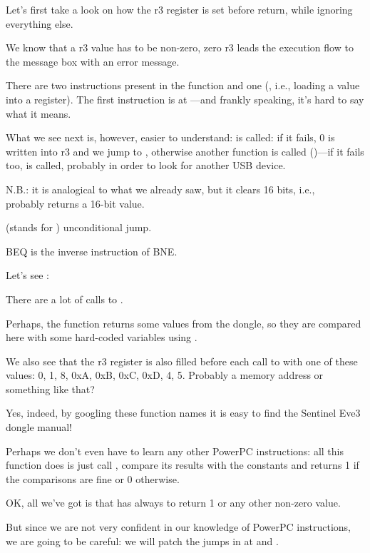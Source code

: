Let's first take a look on how the r3 register is set before return, while ignoring everything else.

We know that a  r3 value has to be non-zero, zero r3 leads the execution
flow to the message box with an error message.

There are two  
instructions present in the function and one  
(, i.e., loading a value into a register).
The first instruction is at 
---and frankly speaking, it's hard to say what it means.

What we see next is, however, easier to understand: 
 is called:
if it fails, 0 is written into r3 and we jump to , otherwise another
function is called ()---if it fails too, 
is called, probably in order to look for another USB device.

N.B.:  it is analogical to what we already saw, but it clears
16 bits, i.e., \\
probably returns a 16-bit value.

 (stands for ) unconditional jump.

\ac{BEQ} is the inverse instruction of \ac{BNE}.

Let's see :



There are a lot of calls to . 

Perhaps, the function returns some values from the dongle,
so they are compared here with some hard-coded variables using .

We also see that the r3 register is also filled before each call to  
with one of these values: 0, 1, 8, 0xA, 0xB, 0xC, 0xD, 4, 5.
Probably a memory address or something like that?

Yes, indeed, by googling these function names it is easy to find the Sentinel Eve3 dongle manual!

Perhaps we don't even have to learn any other PowerPC instructions: all this function does is just
call , compare its results with the constants and returns 1 if the comparisons
are fine or 0 otherwise.

OK, all we've got is that  has always to return 1 or any other non-zero value.

But since we are not very confident in our knowledge of PowerPC instructions, we are going to be careful: we will patch the jumps in  at
 and .

